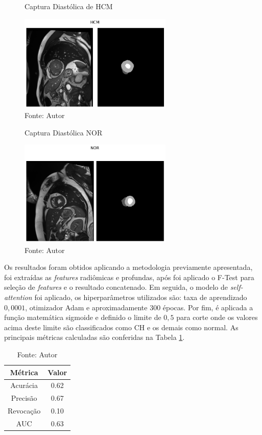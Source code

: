\begin{figure}[htbp]
    \caption{Captura Diastólica de HCM}
    \centering
    \includegraphics[width=0.65\textwidth]{figures/fig019.png}
    \caption{Fonte: Autor}
    \label{fig:fig019}
\end{figure}

\begin{figure}[htbp]
    \caption{Captura Diastólica NOR}
    \centering
    \includegraphics[width=0.65\textwidth]{figures/fig020.png}
    \caption{Fonte: Autor}
    \label{fig:fig020}
\end{figure}

Os resultados foram obtidos aplicando a metodologia previamente apresentada, foi extraídas as \textit{features} radiômicas e profundas, após foi aplicado o F-Test para seleção de \textit{features} e o resultado concatenado. Em seguida, o modelo de \textit{self-attention} foi aplicado, os hiperparâmetros utilizados são: taxa de aprendizado $0,0001$, otimizador \gls{Adam} e aproximadamente 300 épocas. Por fim, é aplicada a função matemática sigmoide e definido o limite de $0,5$ para corte onde os valores acima deste limite são classificados como \gls{CH} e os demais como normal. As principais métricas calculadas são conferidas na Tabela \ref{tab:metrics}.

\begin{table}[hbtp]
    \centering
    \renewcommand{\arraystretch}{1} %
    \begin{tabular}{|c|c|}
    \hline 
          \textbf{Métrica} & \textbf{Valor} \\ 
    \hline 
        Acurácia & 0.62 \\ 
    \hline 
        Precisão & 0.67 \\ 
    \hline 
        Revocação & 0.10 \\ 
    \hline 
        AUC & 0.63 \\ 
    \hline 
    \end{tabular} 
    \caption{Fonte: Autor}
    \label{tab:metrics}
\end{table}

